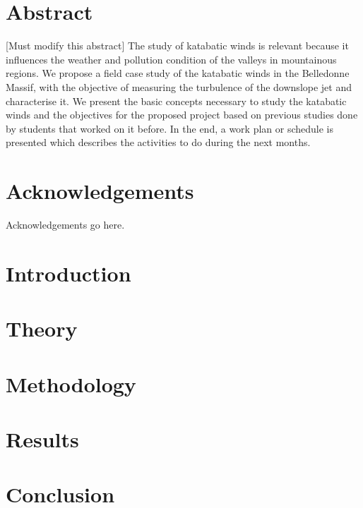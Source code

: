 \documentclass[english, a4paper, 12pt, twoside]{article}
\begin{document}
\linespread{1.5}

\restoregeometry %

\thispagestyle{plain} %
\clearpage\mbox{}\clearpage %

\newpage
\linespread{1.25}
\section*{Abstract}
    [Must modify this abstract] The study of katabatic winds is relevant because it influences the weather and pollution condition of the valleys in mountainous regions. We propose a field case study of the katabatic winds in the Belledonne Massif, with the objective of measuring the turbulence of the downslope jet and characterise it. We present the basic concepts necessary to study the katabatic winds and the objectives for the proposed project based on previous studies done by students that worked on it before. In the end, a work plan or schedule is presented which describes the activities to do during the next months.

\newpage

\section*{Acknowledgements}
    Acknowledgements go here.
\newpage

\tableofcontents
\newpage
\listoffigures

\newpage
{}

\section{Introduction}


\section{Theory}


\section{Methodology} \label{sec:methodology}


\section{Results}


\section{Conclusion}


\clearpage


\end{document}
